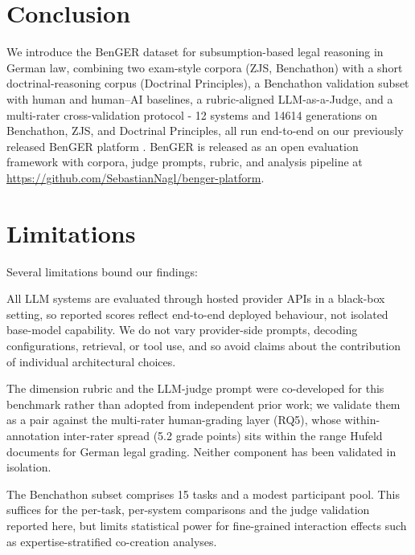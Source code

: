 \documentclass[11pt]{article}
\begin{document}
\section{Conclusion}\label{conclusion}

We introduce the BenGER dataset for subsumption-based legal reasoning in
German law, combining two exam-style corpora (ZJS, Benchathon) with a
short doctrinal-reasoning corpus (Doctrinal Principles), a Benchathon
validation subset with human and human--AI baselines, a rubric-aligned
LLM-as-a-Judge, and a multi-rater cross-validation protocol - 12 systems
and 14614 generations on Benchathon, ZJS, and Doctrinal Principles, all
run end-to-end on our previously released BenGER platform
\citep{nagl2026benger}. BenGER is released as an open evaluation
framework with corpora, judge prompts, rubric, and analysis pipeline at
\url{https://github.com/SebastianNagl/benger-platform}.

\section*{Limitations}\label{limitations}

Several limitations bound our findings:

All LLM systems are evaluated through hosted provider APIs in a
black-box setting, so reported scores reflect end-to-end deployed
behaviour, not isolated base-model capability. We do not vary
provider-side prompts, decoding configurations, retrieval, or tool use,
and so avoid claims about the contribution of individual architectural
choices.

The dimension rubric and the LLM-judge prompt were co-developed for this
benchmark rather than adopted from independent prior work; we validate
them as a pair against the multi-rater human-grading layer (RQ5), whose
within-annotation inter-rater spread (5.2 grade points) sits within the
range Hufeld \citep{hufeld2024} documents for German legal grading.
Neither component has been validated in isolation.

The Benchathon subset comprises 15 tasks and a modest participant pool.
This suffices for the per-task, per-system comparisons and the judge
validation reported here, but limits statistical power for fine-grained
interaction effects such as expertise-stratified co-creation analyses.
\end{document}
